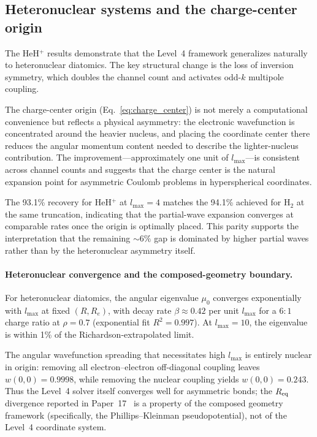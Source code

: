 \documentclass[aps,pra,twocolumn,superscriptaddress,longbibliography]{revtex4-2}
\begin{document}
\subsection{Heteronuclear systems and the charge-center origin}

The HeH$^+$ results demonstrate that the Level~4 framework
generalizes naturally to heteronuclear diatomics.  The key
structural change is the loss of inversion symmetry, which doubles
the channel count and activates odd-$k$ multipole coupling.

The charge-center origin (Eq.~\ref{eq:charge_center}) is not merely
a computational convenience but reflects a physical asymmetry: the
electronic wavefunction is concentrated around the heavier nucleus,
and placing the coordinate center there reduces the angular momentum
content needed to describe the lighter-nucleus contribution.
The improvement---approximately one unit of $l_{\max}$---is
consistent across channel counts and suggests that the charge
center is the natural expansion point for asymmetric Coulomb
problems in hyperspherical coordinates.

The 93.1\% recovery for HeH$^+$ at $l_{\max} = 4$ matches the
94.1\% achieved for H$_2$ at the same truncation, indicating
that the partial-wave expansion converges at comparable rates
once the origin is optimally placed.  This parity supports the
interpretation that the remaining ${\sim}6\%$ gap is dominated
by higher partial waves rather than by the heteronuclear
asymmetry itself.

\paragraph{Heteronuclear convergence and the composed-geometry
boundary.}
For heteronuclear diatomics, the angular eigenvalue $\mu_0$
converges exponentially with $l_{\max}$ at fixed $(R, R_e)$,
with decay rate $\beta \approx 0.42$ per unit $l_{\max}$ for a
$6{:}1$ charge ratio at $\rho = 0.7$ (exponential fit
$R^2 = 0.997$).  At $l_{\max} = 10$, the eigenvalue is within
1\% of the Richardson-extrapolated limit.

The angular wavefunction spreading that necessitates high
$l_{\max}$ is entirely nuclear in origin: removing all
electron--electron off-diagonal coupling leaves
$w(0{,}0) = 0.9998$, while removing the nuclear coupling yields
$w(0{,}0) = 0.243$.  Thus the Level~4 solver itself converges
well for asymmetric bonds; the $R_{\rm eq}$ divergence reported
in Paper~17~\cite{paper17} is a property of the composed geometry
framework (specifically, the Phillips--Kleinman pseudopotential),
not of the Level~4 coordinate system.
\end{document}
